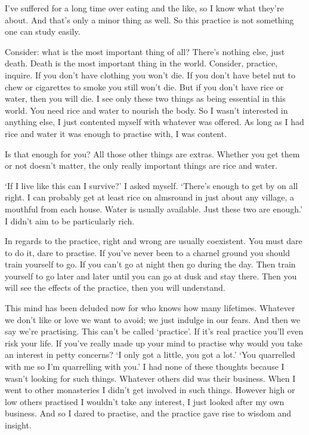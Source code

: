 I've suffered for a long time over eating and the like, so I know what they're about. And that's only a minor thing as well. So this practice is not something one can study easily.

Consider: what is the most important thing of all? There's nothing else, just death. Death is the most important thing in the world. Consider, practice, inquire. If you don't have clothing you won't die. If you don't have betel nut to chew or cigarettes to smoke you still won't die. But if you don't have rice or water, then you will die. I see only these two things as being essential in this world. You need rice and water to nourish the body. So I wasn't interested in anything else, I just contented myself with whatever was offered. As long as I had rice and water it was enough to practise with, I was content.

Is that enough for you? All those other things are extras. Whether you get them or not doesn't matter, the only really important things are rice and water.

`If I live like this can I survive?' I asked myself. `There's enough to get by on all right. I can probably get at least rice on almsround in just about any village, a mouthful from each house. Water is usually available. Just these two are enough.' I didn't aim to be particularly rich.

In regards to the practice, right and wrong are usually coexistent. You must dare to do it, dare to practise. If you've never been to a charnel ground you should train yourself to go. If you can't go at night then go during the day. Then train yourself to go later and later until you can go at dusk and stay there. Then you will see the effects of the practice, then you will understand.

This mind has been deluded now for who knows how many lifetimes. Whatever we don't like or love we want to avoid; we just indulge in our fears. And then we say we're practising. This can't be called `practice'. If it's real practice you'll even risk your life. If you've really made up your mind to practise why would you take an interest in petty concerns? `I only got a little, you got a lot.' `You quarrelled with me so I'm quarrelling with you.' I had none of these thoughts because I wasn't looking for such things. Whatever others did was their business. When I went to other monasteries I didn't get involved in such things. However high or low others practised I wouldn't take any interest, I just looked after my own business. And so I dared to practise, and the practice gave rise to wisdom and insight.

